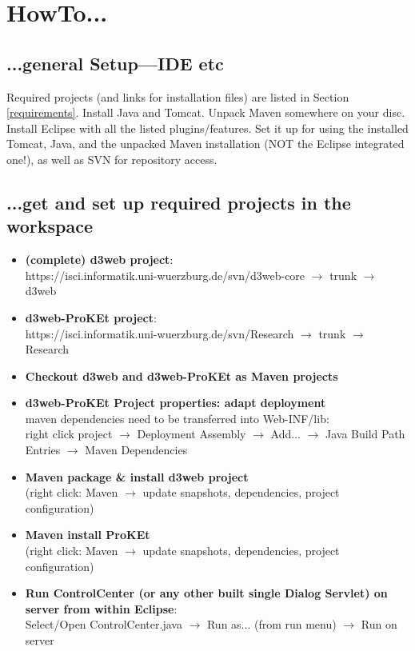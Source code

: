 \documentclass[a4paper,10pt]{scrreprt}
\begin{document}
\chapter{HowTo...}


\section{...general Setup---IDE etc}
Required projects (and links for installation files) are listed in Section \ref{requirements}.
Install Java and Tomcat. Unpack Maven somewhere on your disc. Install Eclipse with all the listed plugins/features.
Set it up for using the installed Tomcat, Java, and the unpacked Maven installation (NOT the Eclipse integrated one!), 
as well as SVN for repository access.


\section{...get and set up required projects in the workspace}
\begin{itemize}
	\item \textbf{(complete) d3web project}:\\
		https://isci.informatik.uni-wuerzburg.de/svn/d3web-core $\rightarrow$ trunk $\rightarrow$ d3web
	\item \textbf{d3web-ProKEt project}:\\
	https://isci.informatik.uni-wuerzburg.de/svn/Research $\rightarrow$ trunk $\rightarrow$ Research
	\item \textbf{Checkout d3web and d3web-ProKEt as Maven projects}
	\item \textbf{d3web-ProKEt Project properties: adapt deployment}\\ 
	maven dependencies need to be transferred into Web-INF/lib:\\
	right click project $\rightarrow$ Deployment Assembly $\rightarrow$  Add... $\rightarrow$ Java Build Path Entries $\rightarrow$ Maven Dependencies
	\item \textbf{Maven package \& install d3web project} \\
	(right click: Maven $\rightarrow$ update snapshots, dependencies, project configuration)
	\item \textbf{Maven install ProKEt}\\
	(right click: Maven $\rightarrow$ update snapshots, dependencies, project configuration)
	\item \textbf{Run ControlCenter (or any other built single Dialog Servlet) on server from within Eclipse}:\\
	Select/Open ControlCenter.java $\rightarrow$ Run as... (from run menu) $\rightarrow$ Run on server
\end{itemize}
\end{document}
